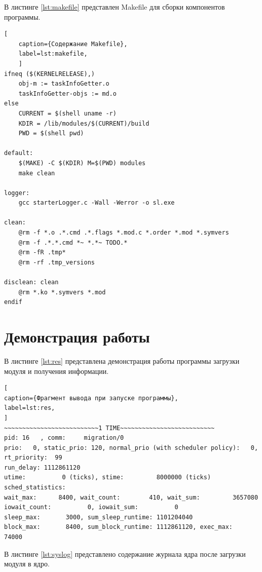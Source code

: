 В листинге \ref{lst:makefile} представлен Makefile для сборки компонентов программы.

\begin{lstlisting}[
	caption={Содержание Makefile},
	label=lst:makefile,
	]
ifneq ($(KERNELRELEASE),)
	obj-m := taskInfoGetter.o
	taskInfoGetter-objs := md.o
else
	CURRENT = $(shell uname -r)
	KDIR = /lib/modules/$(CURRENT)/build
	PWD = $(shell pwd)

default:
	$(MAKE) -C $(KDIR) M=$(PWD) modules
	make clean

logger:
	gcc starterLogger.c -Wall -Werror -o sl.exe

clean:
	@rm -f *.o .*.cmd .*.flags *.mod.c *.order *.mod *.symvers
	@rm -f .*.*.cmd *~ *.*~ TODO.*
	@rm -fR .tmp*
	@rm -rf .tmp_versions

disclean: clean
	@rm *.ko *.symvers *.mod
endif 
\end{lstlisting}



\section{Демонстрация работы}

В листинге \ref{lst:res} представлена демонстрация работы программы загрузки модуля и получения информации.

\begin{lstlisting}[
caption={Фрагмент вывода при запуске программы},
label=lst:res,
]
~~~~~~~~~~~~~~~~~~~~~~~~~~1 TIME~~~~~~~~~~~~~~~~~~~~~~~~~~
pid: 16   , comm:     migration/0
prio:   0, static_prio: 120, normal_prio (with scheduler policy):   0, 
rt_priority:  99
run_delay: 1112861120
utime:          0 (ticks), stime:         8000000 (ticks)
sched_statistics:
wait_max:      8400, wait_count:        410, wait_sum:         3657080
iowait_count:          0, iowait_sum:          0
sleep_max:       3000, sum_sleep_runtime: 1101204040
block_max:       8400, sum_block_runtime: 1112861120, exec_max:      74000
\end{lstlisting}

В листинге \ref{lst:syslog} представлено содержание журнала ядра после загрузки модуля в ядро.

